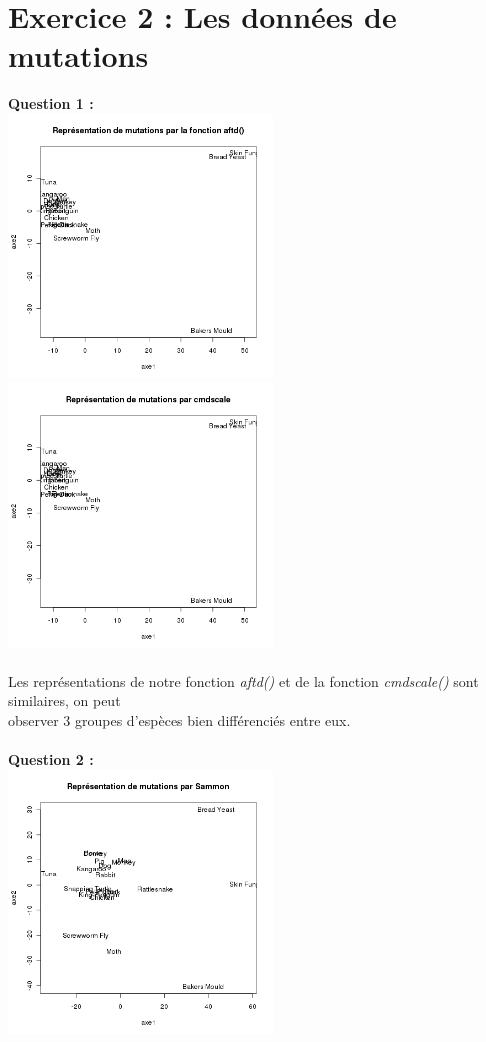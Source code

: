 \documentclass[a4paper, 10pt]{article}
\begin{document}
\section*{Exercice 2 : Les données de mutations}
\textbf{Question 1 :}\\
\includegraphics[height = 7cm, width = 7cm]{plots/plot_mutations_aftd.png}
\includegraphics[height = 7cm, width = 7cm]{plots/plot_mutations_cmdscale.png}\\ \\
Les représentations de notre fonction \textit{aftd()} et de la fonction \textit{cmdscale()} sont similaires,
on peut\\observer 3 groupes d'espèces bien différenciés entre eux.\\ \\
\textbf{Question 2 :}\\
\includegraphics[height = 7cm, width = 7cm]{plots/plot_mutations_sammon.png}
\end{document}
